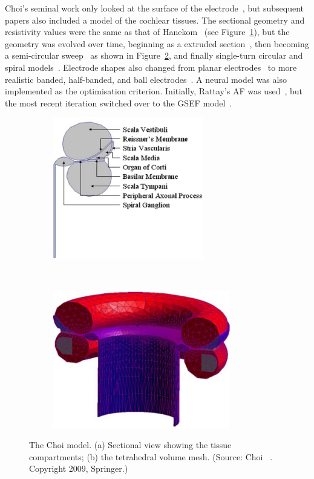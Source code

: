 Choi's seminal work only looked at the surface of the electrode~\cite{choi2001},
but subsequent papers also included a model of the cochlear tissues. The
sectional geometry and resistivity values were the same as that of
Hanekom~\cite{hanekom2001,choi2006} (see Figure~\ref{fig:choi_section}), but the
geometry was evolved over time, beginning as a extruded section~\cite{choi2004},
then becoming a semi-circular sweep~\cite{choi2005,choi2009} as shown in
Figure~\ref{fig:choi_mesh}, and finally single-turn circular and spiral
models~\cite{choi2006,choi2014}. Electrode shapes also changed from planar
electrodes~\cite{choi2004,choi2006} to more realistic banded, half-banded, and
ball electrodes~\cite{choi2005,choi2006,choi2009,choi2014}. A neural model was
also implemented as the optimisation criterion. Initially, Rattay's AF was
used~\cite{rattay1990,choi2004}, but the most recent iteration switched over to
the GSEF model~\cite{frijns1995,choi2014}.

\begin{figure}
	\centering
	
	\begin{subfigure}[t]{0.43\textwidth}
        \centering
        \includegraphics[height=6.2cm]{Background/choi_section}
        \caption{ }
        \label{fig:choi_section}
    \end{subfigure}%
    ~~
    \begin{subfigure}[t]{0.53\textwidth}
        \centering
        \includegraphics[height=6cm]{Background/choi_mesh}
        \caption{ }
        \label{fig:choi_mesh}
    \end{subfigure}%
	
	\caption[The Choi model]{The Choi model. (a) Sectional view showing the tissue
	compartments; (b) the tetrahedral volume mesh. (Source: Choi
	\etal~\cite{choi2009}. Copyright \textcopyright{} 2009, Springer.)}
	\label{fig:model_choi}
\end{figure}

